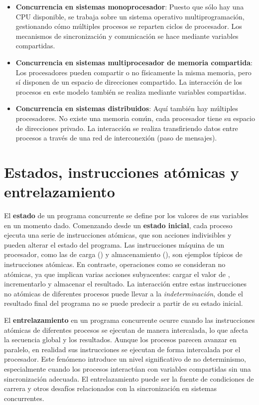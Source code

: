 \begin{itemize}
    \item \textbf{Concurrencia en sistemas monoprocesador}: Puesto que sólo hay una CPU disponible, se trabaja sobre un sistema operativo multiprogramación, gestionando cómo múltiples procesos se reparten ciclos de procesador. Los mecanismos de sincronización y comunicación se hace mediante variables compartidas.
    \item \textbf{Concurrencia en sistemas multiprocesador de memoria compartida}: Los procesadores pueden compartir o no físicamente la misma memoria, pero sí disponen de un espacio de direcciones compartido. La interacción de los procesos en este modelo también se realiza mediante variables compartidas.
    \item \textbf{Concurrencia en sistemas distribuidos}: Aquí también hay múltiples procesadores. No existe una memoria común, cada procesador tiene su espacio de direcciones privado. La interacción se realiza transfiriendo datos entre procesos a través de una red de interconexión (paso de mensajes).
\end{itemize}

\section{Estados, instrucciones atómicas y entrelazamiento}\label{subsec:concurrentatomic}
El \textbf{estado} de un programa concurrente se define por los valores de sus variables en un momento dado. Comenzando desde un \textbf{estado inicial}, cada proceso ejecuta una serie de instrucciones atómicas, que son acciones indivisibles y pueden alterar el estado del programa. Las instrucciones máquina de un procesador, como las de carga () y almacenamiento (), son ejemplos típicos de instrucciones atómicas. En contraste, operaciones como  se consideran no atómicas, ya que implican varias acciones subyacentes: cargar el valor de , incrementarlo y almacenar el resultado. La interacción entre estas instrucciones no atómicas de diferentes procesos puede llevar a la \textit{indeterminación}, donde el resultado final del programa no se puede predecir a partir de su estado inicial.

El \textbf{entrelazamiento} en un programa concurrente ocurre cuando las instrucciones atómicas de diferentes procesos se ejecutan de manera intercalada, lo que afecta la secuencia global y los resultados. Aunque los procesos parecen avanzar en paralelo, en realidad sus instrucciones se ejecutan de forma intercalada por el procesador. Este fenómeno introduce un nivel significativo de no determinismo, especialmente cuando los procesos interactúan con variables compartidas sin una sincronización adecuada. El entrelazamiento puede ser la fuente de condiciones de carrera y otros desafíos relacionados con la sincronización en sistemas concurrentes.

